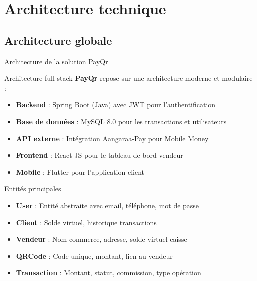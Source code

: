 \documentclass[aspectratio=169,9pt,demo]{beamer}
\begin{document}
\section{\Large Architecture technique}
\subsection{\large Architecture globale}

\begin{frame}{Architecture de la solution PayQr}
\begin{block}{\normalsize Architecture full-stack}
\textbf{PayQr} repose sur une architecture moderne et modulaire :
\begin{itemize}
    \item \textbf{Backend} : Spring Boot (Java) avec JWT pour l'authentification
    \item \textbf{Base de données} : MySQL 8.0 pour les transactions et utilisateurs
    \item \textbf{API externe} : Intégration Aangaraa-Pay pour Mobile Money
    \item \textbf{Frontend} : React JS pour le tableau de bord vendeur
    \item \textbf{Mobile} : Flutter pour l'application client
\end{itemize}
\end{block}

\begin{block}{\normalsize Entités principales}
\begin{itemize}
    \item \textbf{User} : Entité abstraite avec email, téléphone, mot de passe
    \item \textbf{Client} : Solde virtuel, historique transactions
    \item \textbf{Vendeur} : Nom commerce, adresse, solde virtuel caisse
    \item \textbf{QRCode} : Code unique, montant, lien au vendeur
    \item \textbf{Transaction} : Montant, statut, commission, type opération
\end{itemize}
\end{block}
\end{frame}
\end{document}
